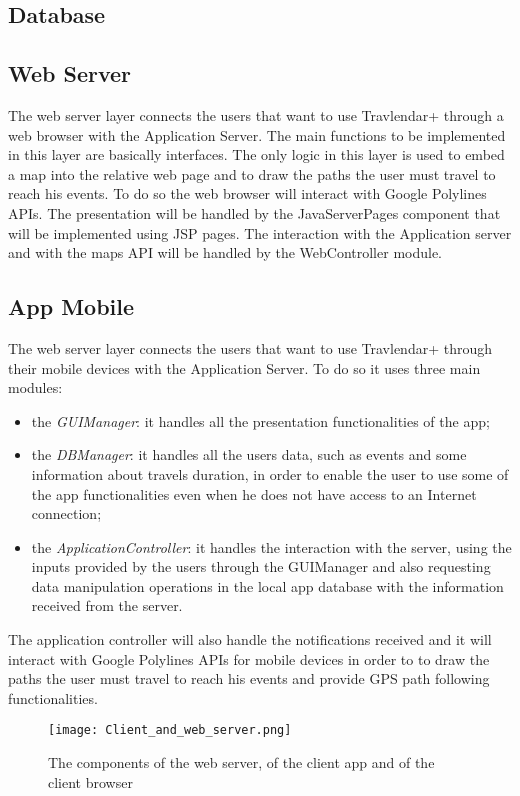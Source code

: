 \subsection{Database}
\label{subsect:Database}

\subsection{Web Server}
\label{subsect:Web Server}
	The web server layer connects the users that want to use Travlendar+ through a web browser with the Application Server. \newline
	The main functions to be implemented in this layer are basically interfaces.
	The only logic in this layer is used to embed a map into the relative web page and to draw the paths the user must travel to reach his events. To do so the web browser will interact with Google Polylines APIs.\newline
	The presentation will be handled by the JavaServerPages component that will be implemented using JSP pages. The interaction with the Application server and with the maps API will be handled by the WebController module.

\subsection{App Mobile}
\label{subsect:App Mobile}
	The web server layer connects the users that want to use Travlendar+ through their mobile devices with the Application Server.
	To do so it uses three main modules: 
	\begin{itemize}
	\item the \textit{GUIManager}: it handles all the presentation functionalities of the app;
	\item the \textit{DBManager}: it handles all the users data, such as events and some information about travels duration, in order to enable the user to use some of the app functionalities even when he does not have access to an Internet connection;
	\item the \textit{ApplicationController}: it handles the interaction with the server, using the inputs provided by the users through the GUIManager and also requesting data manipulation operations in the local app database with the information received from the server.
	\end{itemize}
	The application controller will also handle the notifications received and it will interact with Google Polylines APIs for mobile devices in order to to draw the paths the user must travel to reach his events and provide GPS path following functionalities.
	
	
\begin{figure}[H]
\begin{center}
		\hspace*{-0pt}
		\texttt{[image: Client\_and\_web\_server.png]}
\end{center}
\caption{The components of the web server, of the client app and of the client browser}
\end{figure}